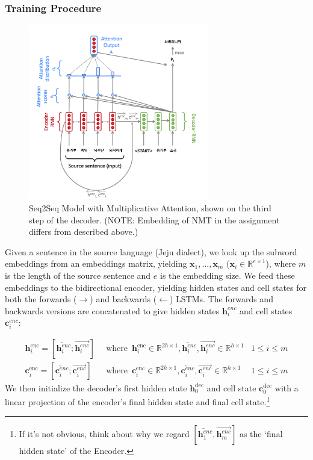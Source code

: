 \documentclass{assignment format}
\newcommand{\Real}{\mathbb{R}}
\newcommand{\henc}{\mathbf{h}^{\text{enc}}}
\newcommand{\hencfw}[1]{\overrightarrow{\mathbf{h}^{enc}_{#1}}}
\newcommand{\hencbw}[1]{\overleftarrow{\mathbf{h}^{enc}_{#1}}}
\newcommand{\cenc}{\mathbf{c}^{\text{enc}}}
\newcommand{\cencfw}[1]{\overrightarrow{\mathbf{c}^{enc}_{#1}}}
\newcommand{\cencbw}[1]{\overleftarrow{\mathbf{c}^{enc}_{#1}}}
\newcommand{\hdec}{\mathbf{h}^{\text{dec}}}
\newcommand{\cdec}{\mathbf{c}^{\text{dec}}}
\begin{document}
 \subsubsection{Training Procedure}
\begin{figure}[h]
    \begin{center}
        \captionsetup{width=0.8\textwidth}
        \includegraphics[width=0.7\textwidth]{nmt.png}
        \caption{Seq2Seq Model with Multiplicative Attention, shown on the third step of the decoder.  (NOTE: Embedding of NMT in the assignment differs from described above.)
        }
        \label{nmt-figure}
    \end{center}
\end{figure}
Given a sentence in the source language (Jeju dialect), we look up the subword embeddings from an embeddings matrix, yielding $\mathbf{x}_1, \dots, \mathbf{x}_m$ ($\mathbf{x}_i \in \mathbb{R}^{e \times 1}$), where $m$ is the length of the source sentence and $e$ is the embedding size. We feed these embeddings to the bidirectional encoder, yielding hidden states and cell states for both the forwards ($\rightarrow$) and backwards ($\leftarrow$) LSTMs. The forwards and backwards versions are concatenated to give hidden states $\mathbf{h}^{enc}_i$ and cell states $\mathbf{c}^{enc}_i$:

\begin{align}
    \henc_i = [\hencbw{i}; \hencfw{i}] \enspace &\text{where}\enspace \henc_i \in \Real^{2h \times 1}, \hencbw{i}, \hencfw{i} \in \Real^{h \times 1} &1 \le i \le m \\
    \cenc_i = [\cencbw{i}; \cencfw{i}] \enspace &\text{where} \enspace \cenc_i \in \Real^{2h \times 1}, \cencbw{i}, \cencfw{i} \in \Real^{h \times 1} &1 \le i \le m
\end{align}
We then initialize the decoder's first hidden state $\hdec_0$ and cell state $\cdec_0$ with a linear projection of the encoder's final hidden state and final cell state.\footnote{If it's not obvious, think about why we regard $[\hencbw{1}, \hencfw{m}]$ as the `final hidden state' of the Encoder.} 
\end{document}
